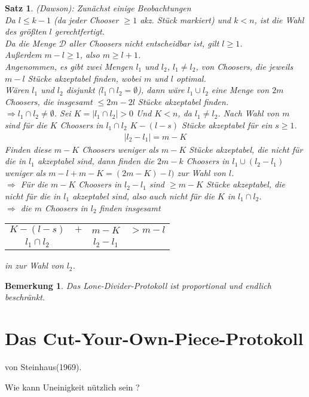 \documentclass[a4paper,10pt]{scrartcl}
\newtheorem*{bemerkung*}{Bemerkung}
\newtheorem*{satz*}{Satz}
\begin{document}
\begin{satz*}
(Dawson): Zunächst einige Beobachtungen\\
Da $l\leq k-1$ (da jeder Chooser $\geq1$ akz. Stück markiert) und $k<n$, ist die Wahl des größten $l$ gerechtfertigt.\\
Da die Menge $\mathcal{D}$ aller Choosers nicht entscheidbar ist, gilt $l\geq1$.\\
Außerdem $m-l\geq1$, also $m\geq l+1$.\\
Angenommen, es gibt zwei Mengen $l_1$ und $l_2$, $l_1\neq l_2$, von Choosers, die jeweils $m-l$ Stücke akzeptabel finden, wobei $m$ und $l$
optimal.\\
Wären $l_1$ und $l_2$ disjunkt ($l_1\cap l_2=\emptyset$), dann wäre $l_1\cup l_2$ eine Menge von $2m$ Choosers, die insgesamt $\leq2m-2l$
Stücke akzeptabel finden.\\
$\Rightarrow l_1\cap l_2\neq\emptyset$. Sei $K=|l_1\cap l_2|>0$ Und $K<n$, da $l_1\neq l_2$.
Nach Wahl von $m$ sind für die $K$ Choosers in $l_1\cap l_2$ $K-(l-s)$ Stücke akzeptabel für ein $s\geq1$.\\
\begin{align*}|l_2-l_1|=m-K\end{align*}
Finden diese $m-K$ Choosers weniger als $m-K$ Stücke akzeptabel, die nicht für die in $l_1$ akzeptabel sind, dann finden die $2m-k$ Choosers
in $l_1\cup(l_2-l_1)$ weniger als $m-l+m-K=(2m-K)-l)$ \blitza zur Wahl von $l$.\\
$\Rightarrow$ Für die $m-K$ Choosers in $l_2-l_1$ sind $\geq m-K$ Stücke akzeptabel, die nicht für die in $l_1$ akzeptabel sind, also auch 
nicht für die $K$ in $l_1\cap l_2$.\\
$\Rightarrow$ die $m$ Choosers in $l_2$ finden insgesamt\\
\begin{tabular}{cccc}
 $K-(l-s)$&$+$&$m-K$&$>m-l$\\
 $l_1\cap l_2$&&$l_2-l_1$&
\end{tabular}in \blitza zur Wahl von $l_2$.
\end{satz*}
\begin{bemerkung*}
 Das Lone-Divider-Protokoll ist proportional und endlich beschränkt.
\end{bemerkung*}

\section{Das Cut-Your-Own-Piece-Protokoll}
von Steinhaus(1969).

Wie kann Uneinigkeit nützlich sein ?
\end{document}
